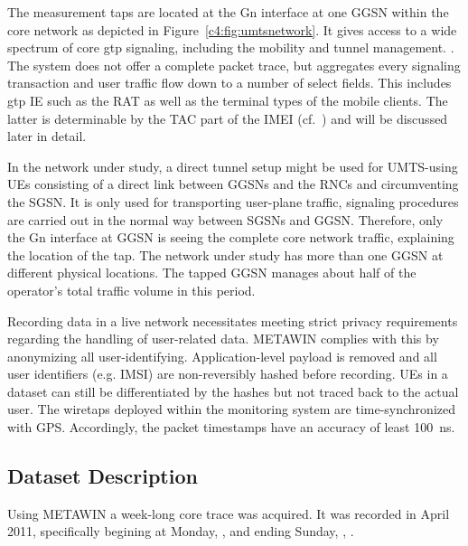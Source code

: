 The measurement taps are located at the Gn interface at one \gls{GGSN} within the core network as depicted in Figure~\ref{c4:fig:umtsnetwork}. It gives access to a wide spectrum of core \gls{gtp} signaling, including the mobility and tunnel management. \cite{3gpp.29.060}. The system does not offer a complete packet trace, but aggregates every signaling transaction and user traffic flow down to a number of select fields. This includes \gls{gtp} \gls{IE} such as the \gls{RAT}  as well as the terminal types of the mobile clients. The latter is determinable by the \gls{TAC} part of the \gls{IMEI} (cf.~\cite{3gpp.23.003}) and will be discussed later in detail.

In the network under study, a direct tunnel setup might be used for \gls{UMTS}-using \glspl{UE} consisting of a direct link between \glspl{GGSN} and the \glspl{RNC} and circumventing the \gls{SGSN}. It is only used for transporting user-plane traffic, signaling procedures are carried out in the normal way between \glspl{SGSN} and \gls{GGSN}. Therefore, only the Gn interface at \gls{GGSN} is seeing the complete core network traffic, explaining the location of the tap. The network under study has more than one \gls{GGSN} at different physical locations. The tapped \gls{GGSN} manages about half of the operator's total traffic volume in this period. 

Recording data in a live network necessitates meeting strict privacy requirements regarding the handling of user-related data. \gls{METAWIN} complies with this by anonymizing all user-identifying. Application-level payload is removed and all user identifiers (e.g. \gls{IMSI}) are non-reversibly hashed before recording. \glspl{UE} in a dataset can still be differentiated by the hashes but not traced back to the actual user. The wiretaps deployed within the monitoring system are time-synchronized with \gls{GPS}. Accordingly, the packet timestamps have an accuracy of least \SI{100}{\nano\second}.


\subsection{Dataset Description}

Using \gls{METAWIN} a week-long core trace was acquired. It was recorded in April 2011, specifically begining at Monday, \yyyymmdddate{},  and ending Sunday, , .

